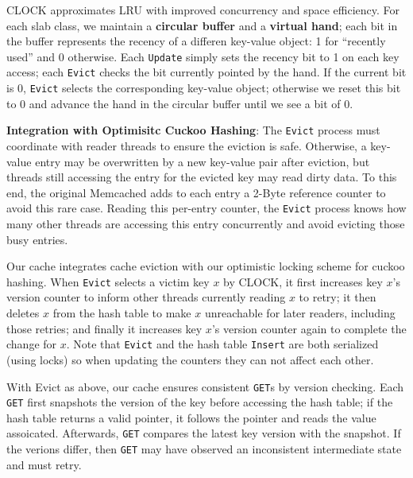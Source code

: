 \documentclass[11pt]{article}
\begin{document}
CLOCK approximates LRU with improved concurrency and space efficiency. For each slab class, we
maintain a \textbf{circular buffer} and a \textbf{virtual hand}; each bit in the buffer represents the recency of a
differen key-value object: 1 for ``recently used'' and 0 otherwise. Each \texttt{Update} simply sets the recency
bit to 1 on each key access; each \texttt{Evict} checks the bit currently pointed by the hand. If the current
bit is 0, \texttt{Evict} selects the corresponding key-value object; otherwise we reset this bit to 0 and
advance the hand in the circular buffer until we see a bit of 0.

\textbf{Integration with Optimisitc Cuckoo Hashing}: The \texttt{Evict} process must coordinate with reader threads to
ensure the eviction is safe. Otherwise, a key-value entry may be overwritten by a new key-value pair
after eviction, but threads still accessing the entry for the evicted key may read dirty data. To
this end, the original Memcached adds to each entry a 2-Byte reference counter to avoid this rare
case. Reading this per-entry counter, the \texttt{Evict} process knows how many other threads are accessing
this entry concurrently and avoid evicting those busy entries.

Our cache integrates cache eviction with our optimistic locking scheme for cuckoo hashing. When \texttt{Evict}
selects a victim key \(x\) by CLOCK, it first increases key \(x\)’s version counter to inform other
threads currently reading \(x\) to retry; it then deletes \(x\) from the hash table to make \(x\)
unreachable for later readers, including those retries; and finally it increases key \(x\)’s version
counter again to complete the change for \(x\). Note that \texttt{Evict} and the hash table \texttt{Insert} are both
serialized (using locks) so when updating the counters they can not affect each other.

With Evict as above, our cache ensures consistent \texttt{GET}s by version checking. Each \texttt{GET} first
snapshots the version of the key before accessing the hash table; if the hash table returns a valid
pointer, it follows the pointer and reads the value assoicated. Afterwards, \texttt{GET} compares the latest
key version with the snapshot. If the verions differ, then \texttt{GET} may have observed an inconsistent
intermediate state and must retry.
\end{document}
